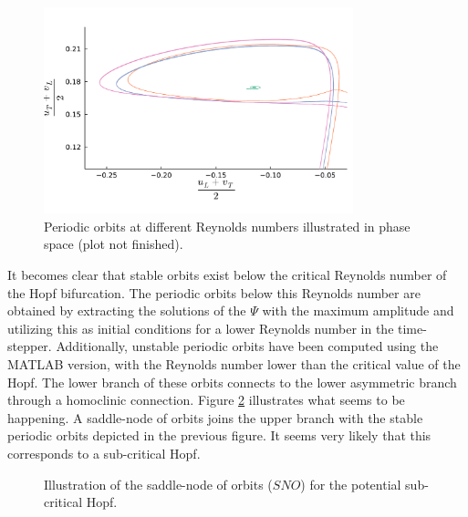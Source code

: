 \begin{figure}[ht]
  \centering
  \includegraphics[width=0.8\textwidth]{figs/orbits_zoom32x32.pdf}
  \caption{Periodic orbits at different Reynolds numbers illustrated in phase space (plot not finished).} 
  \label{fig:orbit}
\end{figure}


It becomes clear that stable orbits exist below the critical Reynolds number of
the Hopf bifurcation. The periodic orbits below this Reynolds number are
obtained by extracting the solutions of the $\Psi$ with the maximum amplitude
and utilizing this as initial conditions for a lower Reynolds number in the
time-stepper. Additionally, unstable periodic orbits have been computed using
the MATLAB version, with the Reynolds number lower than the critical value of
the Hopf. The lower branch of these orbits connects to the lower asymmetric
branch through a homoclinic connection. Figure \ref{fig:sub_hopf_sketch}
illustrates what seems to be happening. A saddle-node of orbits joins the upper
branch with the stable periodic orbits depicted in the previous figure. It
seems very likely that this corresponds to a sub-critical Hopf.

\begin{figure}[h!]
\centering
{}
\caption{Illustration of the saddle-node of orbits ($SNO$) for the potential sub-critical Hopf.} 
\label{fig:sub_hopf_sketch}
\end{figure}

